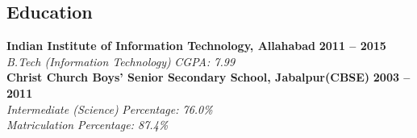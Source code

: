 \documentclass[margin,line]{resume}
\newcounter{dateone}
\newcounter{datetwo}
\newcommand{\difftoday}[3]{%
      \setmydatenumber{dateone}{\the\year}{\the\month}{\the\day}%
      \setmydatenumber{datetwo}{#1}{#2}{#3}%
      \addtocounter{datetwo}{-\thedateone}%
      \the\numexpr-\thedatetwo/365\relax\space year(s),
      \the\numexpr(-\thedatetwo - (-\thedatetwo/365)*365)/30\relax\space month(s)
}
\begin{document}
  \address{mobile: +91-8826567807 \\ email: hp.iiita@gmail.com}
\begin{resume}


    \section{\mysidestyle Education}

    \textbf{Indian Institute of Information Technology, Allahabad} \hfill \textbf{2011 -- 2015}\vspace{0mm}\\\vspace{0mm}%
    \textsl{B.Tech (Information Technology)} \hfill \textsl{CGPA: 7.99}\vspace{2mm}\\
    \textbf{Christ Church Boys' Senior Secondary School, Jabalpur(CBSE)} \hfill \textbf{2003 -- 2011}\vspace{0mm}\\\vspace{0mm}%
    \textsl{Intermediate (Science)} \hfill \textsl{Percentage: 76.0\%}\vspace{0mm}\\\vspace{0mm}%
	\textsl{Matriculation } \hfill \textsl{Percentage: 87.4\%}
	

\end{resume}
\end{document}

